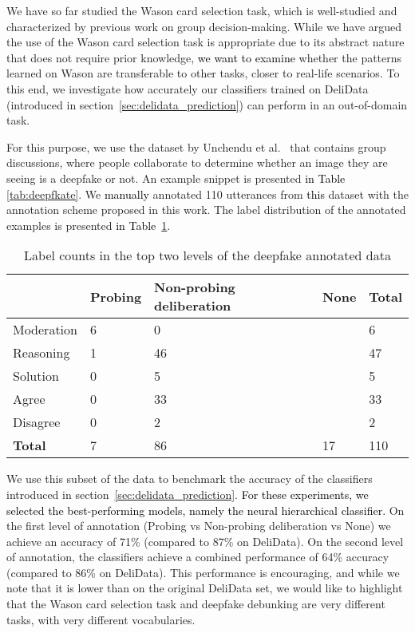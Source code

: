 \documentclass[acmsmall,manuscript,screen]{acmart}
\newcommand\newtext[1]{\textcolor{black}{#1}}
\newcommand\delidata{DeliData }
\begin{document}
We have so far studied the Wason card selection task, which is well-studied and characterized by previous work on group decision-making. While we have argued the use of the Wason card selection task is appropriate due to its abstract nature that does not require prior knowledge, \newtext{we want to examine}
whether the patterns learned on Wason are transferable to other tasks, closer to real-life scenarios. To this end, we investigate how accurately our classifiers trained on \delidata (introduced in section~\ref{sec:delidata_prediction}) can perform in an out-of-domain task.


For this purpose, we use the dataset by Unchendu et al.~\cite{dongwon} that contains group discussions, where people collaborate to determine whether an image they are seeing is a deepfake or not. An example snippet is presented  \newtext{in Table} \ref{tab:deepfkate}. We \newtext{manually} annotated 110 utterances from \newtext{this} dataset with the annotation scheme proposed in this work. The label distribution of the annotated examples is presented \newtext{in Table}~\ref{table:deepfake_training}.

\begin{table}[t!]
\centering
    \begin{tabular}{|l||l|l|l||l|}
    \hline 
    \textbf{} & \textbf{Probing} & \multicolumn{1}{|p{2cm}|}{\centering \textbf{Non-probing deliberation}} & \textbf{None} & \textbf{Total} \\
\hline \hline 
    Moderation & 6 & 0 & & 6 \\ \hline 
    Reasoning & 1 & 46 & & 47 \\ \hline 
    Solution & 0 & 5 & & 5 \\ \hline 
    Agree & 0 & 33 & & 33 \\ \hline 
    Disagree & 0 & 2 & & 2 \\ \hline \hline 
    \textbf{Total} & 7 & 86 & 17 & 110 \\ \hline
\end{tabular}
\caption{Label counts in the top two levels of the deepfake annotated data}
\label{table:deepfake_training}
\end{table} 

We use this subset of the data to benchmark the accuracy of the classifiers introduced in section~\ref{sec:delidata_prediction}. \newtext{For these experiments, we selected the best-performing models, namely the neural hierarchical classifier.} On the first level of annotation (Probing vs Non-probing deliberation vs None) we achieve an accuracy of 71\% (compared to 87\% on DeliData). On the second level of annotation, the classifiers achieve a combined performance of 64\% accuracy (compared to 86\% on DeliData). 
This performance is encouraging, and while we note that it is lower than on the original DeliData set, 
we would like to highlight that the Wason card selection task and deepfake debunking are very different tasks, with very different vocabularies. 
\end{document}
